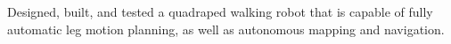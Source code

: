 \documentclass[../Gabriel_Roper_Resume]{subfiles}
\begin{document}


{Designed, built, and tested a quadraped walking robot that
    is capable of fully automatic leg motion planning, as well as autonomous mapping and navigation.}

\end{document}
